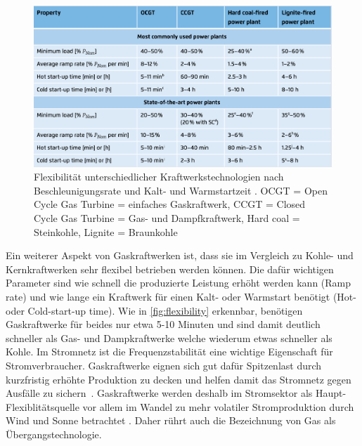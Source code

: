 \begin{figure}[h]
\centering
\includegraphics[width=12cm]{../fig/flexibility_power_plants.png}
\caption{Flexibilität unterschiedlicher Kraftwerkstechnologien nach Beschleunigungsrate und Kalt- und Warmstartzeit \cite{agora}. OCGT = Open Cycle Gas Turbine = einfaches Gaskraftwerk, CCGT = Closed Cycle Gas Turbine = Gas- und Dampfkraftwerk, Hard coal = Steinkohle, Lignite = Braunkohle}
\label{fig:flexibility}
\end{figure}

Ein weiterer Aspekt von Gaskraftwerken ist, dass sie im Vergleich zu Kohle- und Kernkraftwerken sehr flexibel betrieben werden können. Die dafür wichtigen Parameter sind wie schnell die produzierte Leistung erhöht werden kann (Ramp rate) und wie lange ein Kraftwerk für einen Kalt- oder Warmstart benötigt (Hot- oder Cold-start-up time). Wie in \autoref{fig:flexibility} erkennbar, benötigen Gaskraftwerke für beides nur etwa 5-10 Minuten und sind damit deutlich schneller als Gas- und Dampkraftwerke welche wiederum etwas schneller als Kohle. Im Stromnetz ist die Frequenzstabilität eine wichtige Eigenschaft für Stromverbraucher. Gaskraftwerke eignen sich gut dafür Spitzenlast durch kurzfristig erhöhte Produktion zu decken und helfen damit das Stromnetz gegen Ausfälle zu sichern~\cite{ei1}.
Gaskraftwerke werden deshalb im Stromsektor als Haupt-Flexiblitätsquelle vor allem im Wandel zu mehr volatiler Stromproduktion durch Wind und Sonne betrachtet \cite{iea2022}. Daher rührt auch die Bezeichnung von Gas als Übergangstechnologie.

